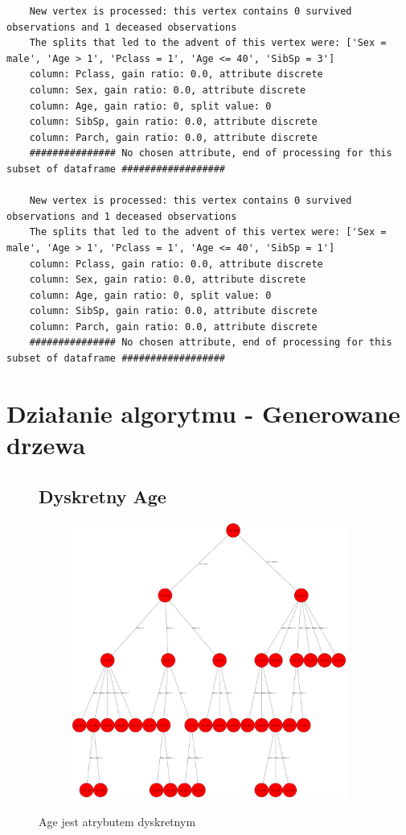 \documentclass[12pt]{article}
\begin{document}
\begin{verbatim}
	New vertex is processed: this vertex contains 0 survived observations and 1 deceased observations
	The splits that led to the advent of this vertex were: ['Sex = male', 'Age > 1', 'Pclass = 1', 'Age <= 40', 'SibSp = 3']
	column: Pclass, gain ratio: 0.0, attribute discrete
	column: Sex, gain ratio: 0.0, attribute discrete
	column: Age, gain ratio: 0, split value: 0
	column: SibSp, gain ratio: 0.0, attribute discrete
	column: Parch, gain ratio: 0.0, attribute discrete
	############### No chosen attribute, end of processing for this subset of dataframe ##################
	
	New vertex is processed: this vertex contains 0 survived observations and 1 deceased observations
	The splits that led to the advent of this vertex were: ['Sex = male', 'Age > 1', 'Pclass = 1', 'Age <= 40', 'SibSp = 1']
	column: Pclass, gain ratio: 0.0, attribute discrete
	column: Sex, gain ratio: 0.0, attribute discrete
	column: Age, gain ratio: 0, split value: 0
	column: SibSp, gain ratio: 0.0, attribute discrete
	column: Parch, gain ratio: 0.0, attribute discrete
	############### No chosen attribute, end of processing for this subset of dataframe ##################	
\end{verbatim}
\section{Działanie algorytmu - Generowane drzewa}

\clearpage
\begin{figure}[h!]
	\subsection{Dyskretny Age}
	\centering
	\begin{subfigure}[b]{1\linewidth}
		\includegraphics[width=\linewidth]{Dyskretny.png}
	\end{subfigure}
	\label{fig:dyskretne}
	\caption{Age jest atrybutem dyskretnym}
\end{figure}
\end{document}
